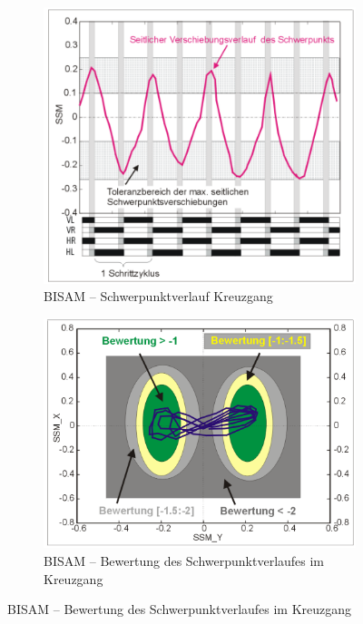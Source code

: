 \begin{figure}
	\centering
	\begin{subfigure}{.4\textwidth}
		\includegraphics[width=\textwidth]{figures/bisam_schwerpunktverlauf_kreuzgang.png}
		\caption{BISAM -- Schwerpunktverlauf Kreuzgang}
	\end{subfigure}
	\begin{subfigure}{.4\textwidth}
		\includegraphics[width=\textwidth]{figures/bisam_schwerpunktverlauf_kreuzgang_1.png}
		\caption{BISAM -- Bewertung des Schwerpunktverlaufes im Kreuzgang}
	\end{subfigure}
\end{figure}

